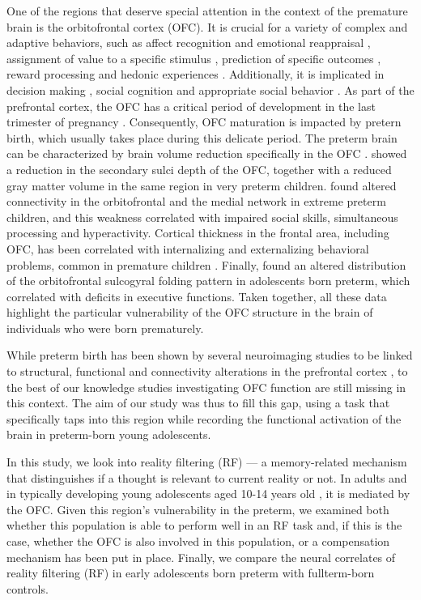 One of the regions that deserve special attention in the context of the premature brain is the orbitofrontal cortex (OFC). It is crucial for a variety of complex and adaptive behaviors, such as affect recognition and emotional reappraisal \citep{Blair2000, Adolphs2001, Wager2008, Dixon2017}, assignment of value to a specific stimulus \citep{Montague2002}, prediction of specific outcomes \citep{Rudebeck2014}, reward processing \citep{Kahnt2018} and hedonic experiences \citep{KRINGELBACH2004}. Additionally, it is implicated in decision making \citep{Bechara2000,McClure2004}, social cognition and appropriate social behavior \citep{Rolls2004,Jonker2015} . As part of the prefrontal cortex, the OFC has a critical period of development in the last trimester of pregnancy \citep{Huttenlocher1997,Ruoss2001}. Consequently, OFC maturation is impacted by pretern birth, which usually takes place during this delicate period. The preterm brain can be characterized by brain volume reduction specifically in the OFC \citep{Thompson2007}. \citet{Gimenez2006} showed a reduction in the secondary sulci depth of the OFC, together with a reduced gray matter volume in the same region in very preterm children. \citet{Fischi-Gomez2015} found altered connectivity in the orbitofrontal and the medial network in extreme preterm children, and this weakness correlated with impaired social skills, simultaneous processing and hyperactivity. Cortical thickness in the frontal area, including OFC, has been correlated with internalizing and externalizing behavioral problems, common in premature children \citep{Zubiaurre-Elorza2012}. Finally, \citet{Ganella2015} found an altered distribution of the orbitofrontal sulcogyral folding pattern in adolescents born preterm, which correlated with deficits in executive functions. Taken together, all these data highlight the particular vulnerability of the OFC structure in the brain of individuals who were born prematurely.



While preterm birth has been shown by several neuroimaging studies to be linked to structural, functional and connectivity alterations in the prefrontal cortex \citep{Gimenez2006, Bjuland2013, Nosarti2014, Sripada2018}, to the best of our knowledge studies investigating OFC function are still missing in this context. The aim of our study was thus to fill this gap, using a task that specifically taps into this region while recording the functional activation of the brain in preterm-born young adolescents. 

In this study, we look into reality filtering (RF)  --- a memory-related mechanism that distinguishes if a thought is relevant to current reality or not. In adults \citep{Schnider2018} and in typically developing young adolescents aged 10-14 years old \citep{Liverani2020}, it is mediated by the OFC. Given this region's vulnerability in the preterm, we examined both whether this population is able to perform well in an RF task and, if this is the case, whether the OFC is also involved in this population, or a compensation mechanism has been put in place.  Finally, we compare the neural correlates of reality filtering (RF) in early adolescents born preterm with fullterm-born controls.

